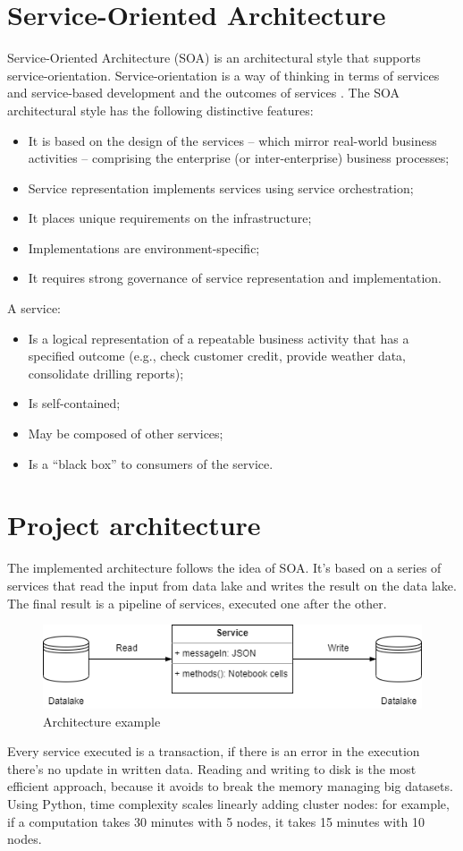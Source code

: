 \documentclass[\main/main.tex]{subfiles}
\begin{document}
\section{Service-Oriented Architecture}
Service-Oriented Architecture (SOA) is an architectural style that supports service-orientation. Service-orientation is a way of thinking in terms of services and service-based development and the outcomes of services \cite{soa_definition}. The SOA architectural style has the following distinctive features:
\begin{itemize}
    \item It is based on the design of the services – which mirror real-world business activities – comprising the enterprise (or inter-enterprise) business processes;
    \item Service representation implements services using service orchestration;
    \item It places unique requirements on the infrastructure;
    \item Implementations are environment-specific;
    \item It requires strong governance of service representation and implementation.
\end{itemize}
A service:
\begin{itemize}
    \item Is a logical representation of a repeatable business activity that has a specified outcome (e.g., check customer credit, provide weather data, consolidate drilling reports);
    \item Is self-contained;
    \item May be composed of other services;
    \item Is a “black box” to consumers of the service.
\end{itemize}

\section{Project architecture}
The implemented architecture follows the idea of SOA. It's based on a series of services that read the input from data lake and writes the result on the data lake. The final result is a pipeline of services, executed one after the other.
\begin{figure}[H]
    \centering
    \includegraphics[scale=0.75]{images/architecture/architecture_service_example.png}
    \caption{Architecture example}
    \label{fig:architecture_example}
\end{figure}
Every service executed is a transaction, if there is an error in the execution there's no update in written data. Reading and writing to disk is the most efficient approach, because it avoids to break the memory managing big datasets. Using Python, time complexity scales linearly adding cluster nodes: for example, if a computation takes 30 minutes with 5 nodes, it takes 15 minutes with 10 nodes. 
\end{document}
